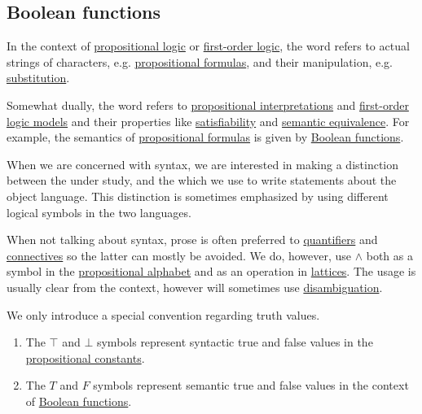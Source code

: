 \subsection{Boolean functions}\label{subsec:boolean_functions}

\begin{remark}\label{remark:metalanguage}
  In the context of \hyperref[subsec:propositional_logic]{propositional logic} or \hyperref[subsec:first_order_logic]{first-order logic}, the word  refers to actual strings of characters, e.g. \hyperref[def:propositional_formula]{propositional formulas}, and their manipulation, e.g. \hyperref[def:propositional_substition]{substitution}.

  Somewhat dually, the word  refers to \hyperref[def:propositional_interpretation]{propositional interpretations} and \hyperref[def:first_order_model]{first-order logic models} and their properties like \hyperref[def:propositional_interpretation/satisfiability]{satisfiability} and \hyperref[def:propositional_interpretation/equivalence]{semantic equivalence}. For example, the semantics of \hyperref[def:propositional_formula]{propositional formulas} is given by \hyperref[def:boolean_function]{Boolean functions}.

  When we are concerned with syntax, we are interested in making a distinction between the  under study, and the  which we use to write statements about the object language. This distinction is sometimes emphasized by using different logical symbols in the two languages.

  When not talking about syntax, prose is often preferred to \hyperref[def:first_order_logic_language/quantifiers]{quantifiers} and \hyperref[def:propositional_alphabet/connectives]{connectives} so the latter can mostly be avoided. We do, however, use \( \wedge \) both as a symbol in the \hyperref[def:propositional_alphabet]{propositional alphabet} and as an operation in \hyperref[def:binary_lattice_operations/meet]{lattices}. The usage is usually clear from the context, however will sometimes use \hyperref[thm:propositional_connectives_ambiguity]{disambiguation}.

  We only introduce a special convention regarding truth values.
  \begin{enumerate}
    \item The \( \top \) and \( \bot \) symbols represent syntactic true and false values in the \hyperref[def:propositional_alphabet/constants]{propositional constants}.
    \item The \( T \) and \( F \) symbols represent semantic true and false values in the context of \hyperref[def:boolean_function]{Boolean functions}.
  \end{enumerate}
\end{remark}


